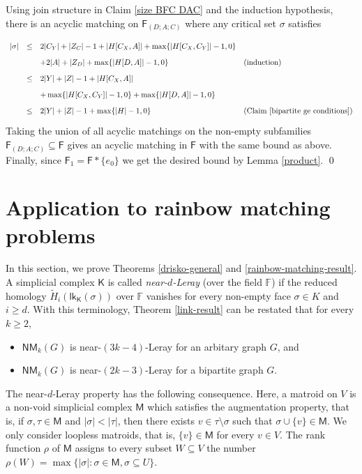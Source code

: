 \documentclass[10pt]{amsart}
\newcommand{\lk}{\mathsf{lk}}
\newcommand{\NM}{\mathsf{NM}}
\theoremstyle{definition}
\begin{document}
	Using join structure in Claim \ref{size BFC DAC} and the induction hypothesis, there is an acyclic matching on $\mathsf{F}_{(D; A; C)}$ where any critical set $\sigma$ satisfies
	\[
	\def\arraystretch{1.75}
	\begin{array}{rcll}
	|\sigma| &\leq & 2|C_Y| + |Z_C| - 1 + |H[C_X,A]| + \max\{|H[C_X, C_Y]|-1, 0\} \\
	&& + 2|A| + |Z_D| + \max\{|H[D,A]|-1, 0\} & \text{(induction)} \\ 
	&\leq & 2|Y| + |Z| -1  + |H[C_X, A]|  & \\ && + \max\{|H[C_X, C_Y]|-1, 0\} + \max\{|H[D,A]|-1, 0\} &  \\
	& \leq & 2|Y| + |Z| -1 + \max\{|H|-1, 0 \} & \text{(Claim \ref{bipartite ge conditions})}
	\end{array}\]
	Taking the union of all acyclic matchings on the non-empty subfamilies $\mathsf{F}_{(D; A; C)}\subseteq \mathsf{F}$ gives an acyclic matching in $\mathsf{F}$ with the same bound as above. Finally, since $\mathsf{F}_1 =\mathsf{F} * \{e_0\}$ we get the desired bound by Lemma \ref{product}.  \qed
	
	
	
	
	
	\section{Application to rainbow matching problems} \label{rainbow applications}
	In this section, we prove Theorems \ref{drisko-general} and \ref{rainbow-matching-result}. 
	A simplicial complex $\mathsf{K}$ is called \textit{near-$d$-Leray} (over the field $\mathbb{F}$) if
	the reduced homology $ \tilde{H}_i(\lk_\mathsf{K}(\sigma))$ over $\mathbb{F}$ vanishes 
	for every non-empty face $\sigma \in K$ and $i\geq d$. With this terminology, Theorem \ref{link-result} can be restated that for every $k\geq 2$,
	\begin{itemize}
		\item $\NM_k(G)$ is near-$(3k-4)$-Leray for an arbitary graph $G$, and
		\item $\NM_k(G)$ is near-$(2k-3)$-Leray for a bipartite graph $G$.
	\end{itemize}
	
	
	The near-$d$-Leray property has the following consequence. Here, a matroid on $V$ is a non-void simplicial complex $\mathsf{M}$ which satisfies the augmentation property, that is, if $\sigma, \tau \in \mathsf{M}$ and $|\sigma|<|\tau|$, then there exists $v\in \tau\setminus \sigma$ such that $\sigma \cup \{v\} \in \mathsf{M}$. We only consider loopless matroids, that is, $\{v\} \in \mathsf{M}$ for every $v\in V$. The rank function $\rho$ of $\mathsf{M}$ assigns to every subset $W\subseteq V$ the number $\rho(W)=\max\{|\sigma|:\sigma\in \mathsf{M}, \sigma \subseteq U\}$.
	
\end{document}
